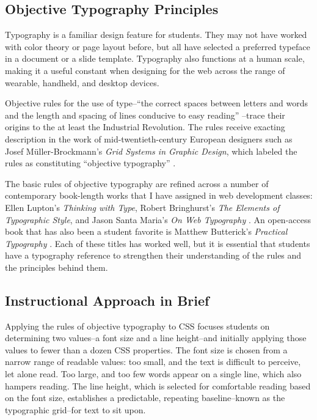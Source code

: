 \documentclass[sigplan,screen]{acmart}
\begin{document}
\subsection{Objective Typography Principles}

Typography is a familiar design feature for students. They may not have worked with color theory or page layout before, but all have selected a preferred typeface in a document or a slide template. Typography also functions at a human scale, making it a useful constant when designing for the web across the range of wearable, handheld, and desktop devices.

Objective rules for the use of type--“the correct spaces between letters and words and the length and spacing of lines conducive to easy reading” \cite[p.~19]{mb:grid}--trace their origins to the at least the Industrial Revolution. The rules receive exacting description in the work of mid-twentieth-century European designers such as Josef Müller-Brockmann’s {\itshape Grid Systems in Graphic Design}, which labeled the rules as constituting “objective typography” \cite[p.~7]{mb:grid}.

The basic rules of objective typography are refined across a number of contemporary book-length works that I have assigned in web development classes: Ellen Lupton’s {\itshape Thinking with Type}, Robert Bringhurst’s {\itshape The Elements of Typographic Style}, and Jason Santa Maria’s {\itshape On Web Typography} \cite{el:type,rb:style,jsm:owt}. An open-access book that has also been a student favorite is Matthew Butterick’s {\itshape Practical Typography} \cite{mb:pt}. Each of these titles has worked well, but it is essential that students have a typography reference to strengthen their understanding of the rules and the principles behind them.

\subsection{Instructional Approach in Brief}

Applying the rules of objective typography to CSS focuses students on determining two values--a font size and a line height--and initially applying those values to fewer than a dozen CSS properties. The font size is chosen from a narrow range of readable values: too small, and the text is difficult to perceive, let alone read. Too large, and too few words appear on a single line, which also hampers reading. The line height, which is selected for comfortable reading based on the font size, establishes a predictable, repeating baseline--known as the typographic grid--for text to sit upon. 
\end{document}
